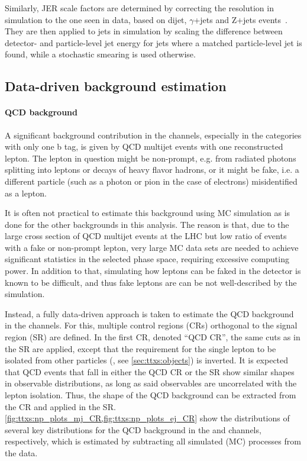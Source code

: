 Similarly, JER scale factors are determined by correcting the resolution in simulation to the one seen in data, based on dijet, $\gamma$+jets and Z+jets events~\cite{CMS:JME-10-011}. They are then applied to jets in simulation by scaling the difference between detector- and particle-level jet energy for jets where a matched particle-level jet is found, while a stochastic smearing is used otherwise.


\subsection{Data-driven background estimation}
\label{sec:ttxs:datadriven}

\paragraph{QCD background}

A significant background contribution in the \ljets channels, especially in the categories with only one b tag, is given by QCD multijet events with one reconstructed lepton. The lepton in question might be non-prompt, e.g. from radiated photons splitting into leptons or decays of heavy flavor hadrons, or it might be fake, i.e. a different particle (such as a photon or pion in the case of electrons) misidentified as a lepton.

It is often not practical to estimate this background using MC simulation as is done for the other backgrounds in this analysis. The reason is that, due to the large cross section of QCD multijet events at the LHC but low ratio of events with a fake or non-prompt lepton, very large MC data sets are needed to achieve significant statistics in the selected phase space, requiring excessive computing power. In addition to that, 
simulating how leptons can be faked in the detector is known to be difficult, and thus 
fake leptons are can be not well-described by the simulation.

Instead, a fully data-driven approach is taken to estimate the QCD background in the \ljets channels. For this, multiple control regions (CRs) orthogonal to the signal region (SR) are defined. In the first CR, denoted ``QCD CR'', the same cuts as in the SR are applied, except that the requirement for the single lepton to be isolated from other particles (\Irel, see \cref{sec:ttxs:objects}) is inverted. It is expected that QCD events that fall in either the QCD CR or the SR show similar shapes in observable distributions, as long as said observables are uncorrelated with the lepton isolation. Thus, the shape of the QCD background can be extracted from the CR and applied in the SR. \cref{fig:ttxs:np_plots_mj_CR,fig:ttxs:np_plots_ej_CR} show the distributions of several key distributions for the QCD background in the \mujets and \ejets channels, respectively, which is estimated by subtracting all simulated (MC) processes from the data.

